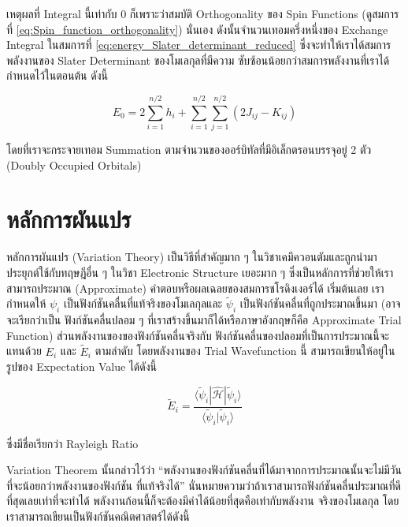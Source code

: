 \noindent เหตุผลที่ Integral นี้เท่ากับ 0 ก็เพราะว่าสมบัติ Orthogonality ของ Spin Functions
(ดูสมการที่ \eqref{eq:Spin_function_orthogonality}) นั่นเอง ดังนั้นจำนวนเทอมครึ่งหนึ่งของ Exchange Integral ในสมการที่
\eqref{eq:energy_Slater_determinant_reduced} ซึ่งจะทำให้เราได้สมการพลังงานของ Slater Determinant ของโมเลกุลที่มีความ%
ซับซ้อนน้อยกว่าสมการพลังงานที่เราได้กำหนดไว้ในตอนต้น ดังนี้

\begin{equation}
    E_0
    =
    2 \sum_{i=1}^{n / 2} h_i
    + \sum_{i=1}^{n / 2}
    \sum_{j=1}^{n / 2}
    \left(2 J_{i j} - K_{i j}\right)
\end{equation}

\noindent โดยที่เราจะกระจายเทอม Summation ตามจำนวนของออร์บิทัลที่มีอิเล็กตรอนบรรจุอยู่ 2 ตัว (Doubly Occupied Orbitals)

\section{หลักการผันแปร}

หลักการผันแปร (Variation Theory) เป็นวิธีที่สำคัญมาก ๆ ในวิชาเคมึควอนตัมและถูกนำมาประยุกต์ใช้กับทฤษฎีอื่น ๆ ในวิชา Electronic
Structure เยอะมาก ๆ ซึ่งเป็นหลักการที่ช่วยให้เราสามารถประมาณ (Approximate) คำตอบหรือผลเฉลยของสมการชโรดิงเงอร์ได้ เริ่มต้นเลย%
เรากำหนดให้ $\psi_i$ เป็นฟังก์ชันคลื่นที่แท้จริงของโมเลกุลและ $\tilde{\psi}_i$ เป็นฟังก์ชันคลื่นที่ถูกประมาณขึ้นมา (อาจจะเรียกว่าเป็น%
ฟังก์ชันคลื่นปลอม ๆ ที่เราสร้างขึ้นมาก็ได้หรือภาษาอังกฤษก็คือ Approximate Trial Function) ส่วนพลังงานของของฟังก์ชันคลื่นจริงกับ%
ฟังก์ชันคลื่นของปลอมที่เป็นการประมาณนี้จะแทนด้วย $E_i$ และ $\tilde{E}_i$ ตามลำดับ โดยพลังงานของ Trial Wavefunction นี้%
สามารถเขียนให้อยู่ในรูปของ Expectation Value ได้ดังนี้

\begin{equation}
    \label{eq:Rayleigh_ratio}
    \tilde{E}_i
    =
    \frac
    {
        \langle
        \tilde{\psi}_i | \hat{\mathscr{H}} | \tilde{\psi}_i
        \rangle
    }
    {
        \langle
        \tilde{\psi}_i | \tilde{\psi}_i
        \rangle
    }
\end{equation}

\noindent ซึ่งมีชื่อเรียกว่า Rayleigh Ratio

Variation Theorem นั้นกล่าวไว้ว่า \enquote{พลังงานของฟังก์ชันคลื่นที่ได้มาจากการประมาณนั้นจะไม่มีวันที่จะน้อยกว่าพลังงานของฟังก์ชัน%
    ที่แท้จริงได้} นั่นหมายความว่าถ้าเราสามารถฟังก์ชันคลื่นประมาณที่ดีที่สุดเลยเท่าที่จะทำได้ พลังงานก้อนนี้ก็จะต้องมีค่าได้น้อยที่สุดคือเท่ากับพลังงาน%
จริงของโมเลกุล โดยเราสามารถเขียนเป็นฟังก์ชันคณิตศาสตร์ได้ดังนี้

